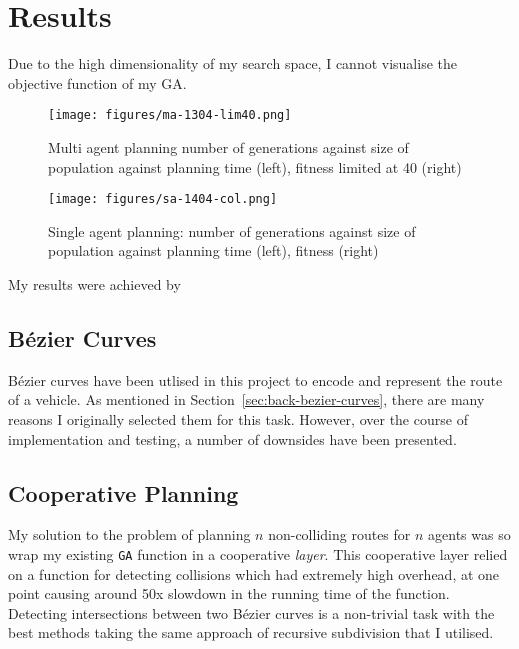 \section{Results}

Due to the high dimensionality of my search space, I cannot visualise the objective function of my GA.

\begin{figure}[ht]
  \centering
  \texttt{[image: figures/ma-1304-lim40.png]}
  \caption{\label{fig:ma-lim40} Multi agent planning number of generations against size of population against planning time (left), fitness limited at 40 (right)}
\end{figure}

\begin{figure}[ht]
  \centering
  \texttt{[image: figures/sa-1404-col.png]}
  \caption{\label{fig:sa-col} Single agent planning: number of generations against size of population against planning time (left), fitness (right)}
\end{figure}

My results were achieved by
\subsection{Bézier Curves}

Bézier curves have been utlised in this project to encode and represent the route of a vehicle. As mentioned in Section~\ref{sec:back-bezier-curves}, there are many reasons I originally selected them for this task. However, over the course of implementation and testing, a number of downsides have been presented.

\subsection{Cooperative Planning}
\label{subsec:eval-cooperativeplanning}

My solution to the problem of planning $n$ non-colliding routes for $n$ agents was so wrap my existing \texttt{GA} function in a cooperative \textit{layer}. This cooperative layer relied on a function for detecting collisions which had extremely high overhead, at one point causing around 50x slowdown in the running time of the function. Detecting intersections between two Bézier curves is a non-trivial task with the best methods taking the same approach of recursive subdivision that I utilised.





